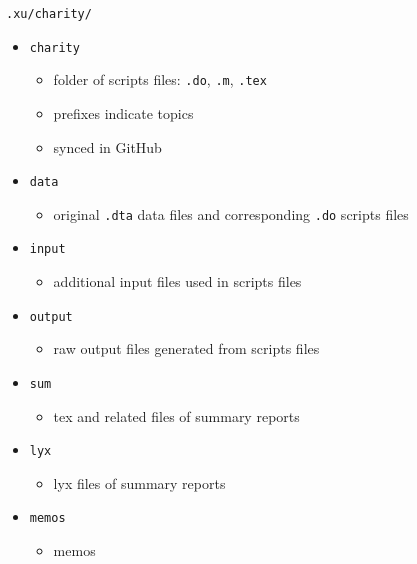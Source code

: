 \texttt{.xu/charity/}
\begin{itemize}
	\item \texttt{charity}
	\begin{itemize}
		\item folder of scripts files: \texttt{.do}, \texttt{.m}, \texttt{.tex}
		\item prefixes indicate topics
		\item synced in GitHub
	\end{itemize}
	\item \texttt{data}
	\begin{itemize}
		\item original \texttt{.dta} data files and corresponding \texttt{.do} scripts files
	\end{itemize}
	\item \texttt{input}
	\begin{itemize}
		\item additional input files used in scripts files
	\end{itemize}
	\item \texttt{output}
	\begin{itemize}
		\item raw output files generated from scripts files
	\end{itemize}
	\item \texttt{sum}
	\begin{itemize}
		\item tex and related files of summary reports
	\end{itemize}
\item \texttt{lyx}
\begin{itemize}
\item lyx files of summary reports
\end{itemize}
	\item \texttt{memos}
	\begin{itemize}
		\item memos
	\end{itemize}
\end{itemize}
